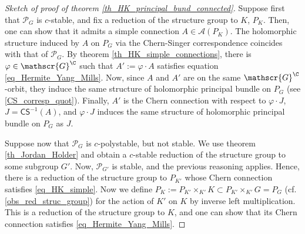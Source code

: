 \begin{proof}[\textit{Sketch of proof of theorem} \ref{th_HK_principal_bund_connected}]
    Suppose first that \(\mathcal{P}_G\) is \(c\)-stable, and fix a reduction of the structure group to \(K\), \(P_K\). Then, one can show that it admits a simple connection \(A \in \mathscr{A}(P_K)\). The holomorphic structure induced by \(A\) on \(P_G\) via the Chern-Singer correspondence coincides with that of \(\mathcal{P}_G\). By theorem \ref{th_HK_simple_connections}, there is \(\varphi \in \mathscr{G}^\C\) such that \(A':=\varphi\cdot A\) satisfies equation \ref{eq_Hermite_Yang_Mills}. Now, since \(A\) and \(A'\) are on the same \(\mathscr{G}^\C\)-orbit, they induce the same structure of holomorphic principal bundle on \(P_G\) (see \eqref{CS_corresp_quot}). Finally, \(A'\) is the Chern connection with respect to \(\varphi\cdot J\), \(J=\mathsf{CS}^{-1}(A)\), and \(\varphi\cdot J\) induces the same structure of holomorphic principal bundle on \(P_G\) as \(J\). 
    
    Suppose now that \(\mathcal{P}_G\) is \(c\)-polystable, but not stable. We use theorem \ref{th_Jordan_Holder} and obtain a \(c\)-stable reduction of the structure group to some subgroup \(G'\). Now, \(\mathcal{P}_{G'}\) is stable, and the previous reasoning applies. Hence, there is a reduction of the structure group to \(P_{K'}\) whose Chern connection satisfies \eqref{eq_HK_simple}. Now we define \(P_K:=P_{K'} \times _{K'} K\subset P_{K'} \times_{K'} G=P_G\) (cf. \ref{obs_red_struc_group}) for the action of \(K'\) on \(K\) by inverse left multiplication. This is a reduction of the structure group to \(K\), and one can show that its Chern connection satisfies \eqref{eq_Hermite_Yang_Mills}. 


\end{proof}
